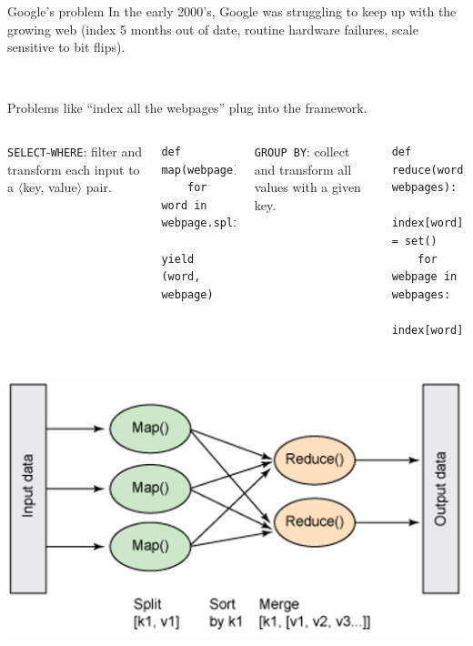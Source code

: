 \documentclass[aspectratio=169]{beamer}
\begin{document}
\begin{frame}{Google's problem}
\large
\vspace{0.45 cm}
In the early 2000's, Google was struggling to keep up with the growing web (index 5 months out of date, routine hardware failures, scale sensitive to bit flips).

\vspace{0.7 cm}

\vspace{0.7 cm}

\vspace{0.7 cm}
\mbox{ } \hfill {} \hfill \mbox{ }

\vspace{0.7 cm}

\end{frame}

\begin{frame}[fragile]{Problems like ``index all the webpages'' plug into the framework.}
\vspace{0.5 cm}
\begin{columns}
\texttt{SELECT}-\texttt{WHERE}: filter and transform each input to a $\langle$key, value$\rangle$ pair.

\small
\begin{verbatim}
def map(webpage):
    for word in webpage.split():
        yield (word, webpage)

\end{verbatim}

\texttt{GROUP BY}: collect and transform all values with a given key.

\small
\begin{verbatim}
def reduce(word, webpages):
    index[word] = set()
    for webpage in webpages:
        index[word].add(webpage)
\end{verbatim}
\end{columns}

\vspace{0.25 cm}
\mbox{ } \hfill \includegraphics[width=0.55\linewidth]{mapreduce-diagram-by-ibm.png} \hfill \mbox{ }
\end{frame}
\end{document}
